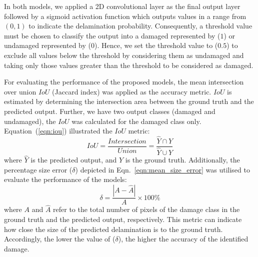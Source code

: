 In both models, we applied a 2D convolutional layer as the final output layer followed by a sigmoid activation function which outputs values in a range from \((0,1)\) to indicate the delamination probability.
Consequently, a threshold value must be chosen to classify the output into a damaged represented by (\(1\)) or undamaged represented by (\(0\)).
Hence, we set the threshold value to (\(0.5\)) to exclude all values below the threshold by considering them as undamaged and taking only those values greater than the threshold to be considered as damaged.

For evaluating the performance of the proposed models, the mean 
intersection over union \(IoU\) (Jaccard index) was applied as the accuracy metric. 
\(IoU\) is estimated by determining the intersection
area between the ground truth and the predicted output. 
Further, we have two output classes (damaged and undamaged), the \(IoU\) was calculated for the damaged class only. 
Equation~(\ref{eqn:iou}) illustrated the \(IoU\) metric: 
\begin{equation}
	IoU=\frac{Intersection}{Union}=\frac{\hat{Y} \cap Y}{\hat{Y} \cup Y}
	\label{eqn:iou}
\end{equation}
where \(\hat{Y}\) is the predicted output, and \(Y\) is the ground truth.
Additionally, the percentage size error ($\delta$) depicted in Eqn.~\ref{eqn:mean_size_error} was utilised to evaluate the performance of the models:
\begin{equation}
	\delta=\frac{|A-\hat{A}|}{A} \times 100\%
	\label{eqn:mean_size_error}
\end{equation}
where \(A\) and \(\hat{A}\) refer to the total number of pixels of the damage class in the ground truth and the predicted output, respectively.
This metric can indicate how close the size of the predicted delamination is to the ground truth.
Accordingly, the lower the value of ($\delta$), the higher the accuracy of the identified damage. 
